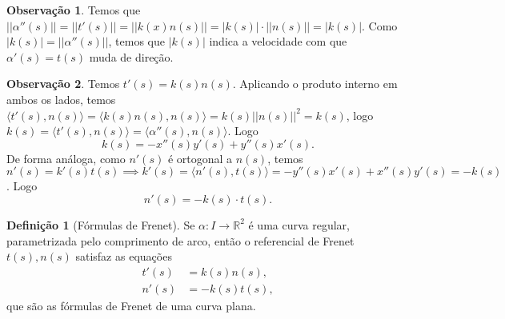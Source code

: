 \documentclass[12pt,leqno,twoside]{amsart}
\theoremstyle{definition}
\newtheorem{definicao}{Definição}[section]
\newtheorem*{obs}{Observação}
\begin{document}
\vspace{0.2cm}

\begin{obs}
	Temos que $|| \alpha''(s) || = || t'(s) || = || k(x) n(s)|| = |k(s)| \cdot || n(s)|| = |k(s)|$. Como $|k(s)| = ||\alpha''(s)||$, temos que $|k(s)|$ indica a velocidade com que $\alpha'(s) = t(s)$ muda de direção.
\end{obs}

\vspace{0.2cm}

\begin{obs}
	Temos $t'(s) = k(s) n(s)$. Aplicando o produto interno em ambos os lados, temos $\langle t'(s), n(s) \rangle = \langle k(s) n(s), n(s) \rangle = k(s) || n(s)||^2 = k(s)$, logo $k(s) = \langle t'(s),n(s) \rangle = \langle \alpha''(s), n(s) \rangle$. Logo $$k(s) = -x''(s) y'(s) + y''(s) x'(s).$$ De forma análoga, como $n'(s)$ é ortogonal a $n(s)$, temos $ n'(s) = k'(s) t(s) \implies  k'(s) = \langle n'(s), t(s) \rangle = -y''(s)x'(s) + x''(s) y'(s) = -k(s) $. Logo $$n'(s) = -k(s) \cdot t(s).$$
\end{obs}

\vspace{0.2cm}

\begin{definicao}[Fórmulas de Frenet]
	Se $\alpha:I\to \mathbb{R}^2$ é uma curva regular, parametrizada pelo comprimento de arco, então o referencial de Frenet $t(s), n(s)$ satisfaz as equações \begin{align*} t'(s) &= k(s)n(s), \\ n'(s) &= -k(s) t(s),\end{align*}
	que são as fórmulas de Frenet de uma curva plana.
\end{definicao}


\vspace{0.2cm}
\end{document}
